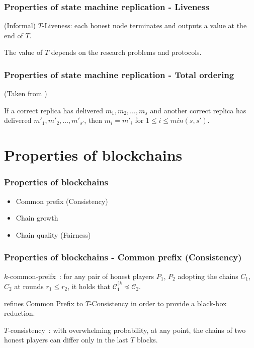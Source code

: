 \documentclass{beamer}
\begin{document}
\begin{frame}
\frametitle{Properties of state machine replication - Liveness}

(Informal) $T$-Liveness: each honest node terminates and outputs a value at the end of $T$.

The value of $T$ depends on the research problems and protocols.

\end{frame}


\begin{frame}
\frametitle{Properties of state machine replication - Total ordering}

(Taken from \cite{duan2018beat}) 

\begin{definition}
If a correct replica has delivered $m_1, m_2, \dots ,m_s$ and another correct replica has delivered $m'_1,m'_2, \dots,m'_{s'}$, then $m_i = m'_i$ for $1 \leq i \leq min(s, s')$.
\end{definition}

\end{frame}


\section{Properties of blockchains}

\begin{frame}
\frametitle{Properties of blockchains}

\begin{itemize}
    \item Common prefix (Consistency)
    \item Chain growth
    \item Chain quality (Fairness)
\end{itemize}

\end{frame}


\begin{frame}
\frametitle{Properties of blockchains - Common prefix (Consistency)}

$k$-common-preifx~\cite{garay2015bitcoin}:
for any pair of honest players $P_1$, $P_2$ adopting the chains $C_1$, $C_2$ at rounds $r_1 \leq r_2$, it holds that $\mathcal{C}_{1}^{\lceil k} \preceq \mathcal{C}_2$.

\cite{pass2017analysis} refines Common Prefix to $T$-Consistency in order to provide a black-box reduction.

$T$-consistency~\cite{pass2017analysis}:
with overwhelming probability, at any point, the chains of two honest players can differ only in the last $T$ blocks.


\end{frame}
\end{document}
